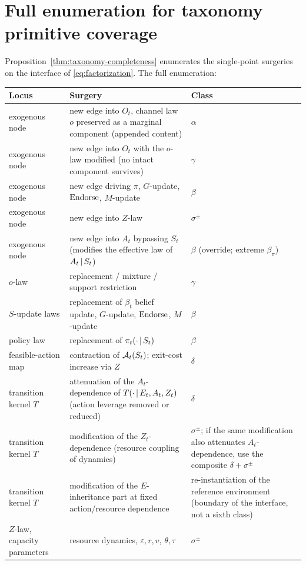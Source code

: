 \section{Full enumeration for taxonomy primitive coverage}
\label{app:taxonomy}

Proposition~\ref{thm:taxonomy-completeness} enumerates the single-point
surgeries on the interface of \eqref{eq:factorization}. The full enumeration:

\begin{center}\small
\begin{tabularx}{\textwidth}{@{}l >{\raggedright\arraybackslash}X
>{\raggedright\arraybackslash}X@{}}
\toprule
Locus & Surgery & Class \\
\midrule
exogenous node & new edge into $O_t$, channel law $o$ preserved as a
marginal component (appended content) & $\alpha$ \\
exogenous node & new edge into $O_t$ with the $o$-law modified (no intact
component survives) & $\gamma$ \\
exogenous node & new edge driving $\pi$, $G$-update, $\mathrm{Endorse}$, $M$-update
& $\beta$ \\
exogenous node & new edge into $Z$-law & $\sigma^{\pm}$ \\
exogenous node & new edge into $A_t$ bypassing $S_t$ (modifies the effective
law of $A_t\,|\, S_t$) & $\beta$ (override; extreme $\beta_\pi$) \\
$o$-law & replacement / mixture / support restriction & $\gamma$ \\
$S$-update laws & replacement of $\beta_t$ belief update, $G$-update,
$\mathrm{Endorse}$, $M$-update & $\beta$ \\
policy law & replacement of $\pi_t(\cdot\,|\, S_t)$ & $\beta$ \\
feasible-action map & contraction of $\mathcal{A}_t(S_t)$; exit-cost increase via
$Z$ & $\delta$ \\
transition kernel $T$ & attenuation of the $A_t$-dependence of
$T(\cdot\,|\, E_t,A_t,Z_t)$ (action leverage removed or reduced) & $\delta$ \\
transition kernel $T$ & modification of the $Z_t$-dependence (resource
coupling of dynamics) & $\sigma^{\pm}$; if the same modification also
attenuates $A_t$-dependence, use the composite $\delta+\sigma^{\pm}$ \\
transition kernel $T$ & modification of the $E$-inheritance part at fixed
action/resource dependence & re-instantiation of the reference environment
(boundary of the interface, not a sixth class) \\
$Z$-law, capacity parameters & resource dynamics, $\varepsilon,r,v$,
$\theta,\tau$ & $\sigma^{\pm}$ \\
\bottomrule
\end{tabularx}
\end{center}

